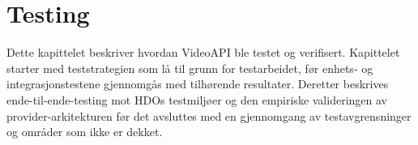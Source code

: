 \chapter{Testing}
\label{ch:testing}

Dette kapittelet beskriver hvordan VideoAPI ble testet og verifisert. Kapittelet starter med teststrategien som lå til grunn for testarbeidet, før enhets- og integrasjonstestene gjennomgås med tilhørende resultater. Deretter beskrives ende-til-ende-testing mot HDOs testmiljøer og den empiriske valideringen av provider-arkitekturen før det avsluttes med en gjennomgang av testavgrensninger og områder som ikke er dekket.








